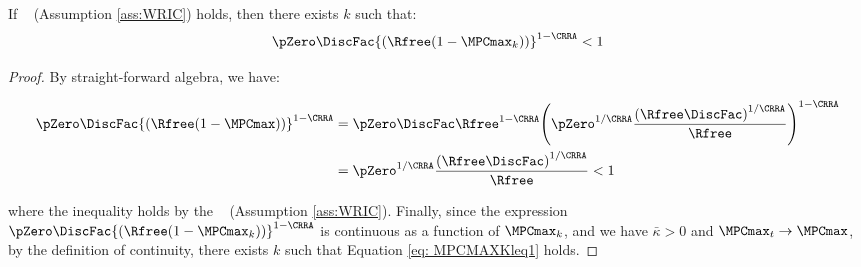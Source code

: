 \documentclass[\econtexRoot/BufferStockTheory]{subfiles}
\begin{document}
\begin{claim}\label{claim: MPCMAXKleq1}
If \WRIC~ (Assumption \ref{ass:WRIC}) holds, then there exists $k$ such that:
%
%
\begin{equation}\label{eq: MPCMAXKleq1}
  \pZero \DiscFac {(\Rfree (1-\MPCmax_{k}))}^{1-\CRRA}   < 1
\end{equation}
%
\end{claim}
\begin{proof}

By straight-forward algebra, we have:

\begin{align}
\pZero \DiscFac {(\Rfree (1-\MPCmax))}^{1-\CRRA}  & = \pZero\DiscFac\Rfree^{1-\CRRA}{\left(\pZero^{1/\CRRA}\frac{{(\Rfree\DiscFac)}^{1/\CRRA}}{\Rfree}\right)}^{1-\CRRA} \\\notag
& = \pZero^{1/\CRRA}\frac{{(\Rfree\DiscFac)}^{1/\CRRA}}{\Rfree} <1 \notag
\end{align}

where the inequality holds by the \WRIC ~ (Assumption \ref{ass:WRIC}). Finally, since the expression $\pZero \DiscFac {(\Rfree (1-\MPCmax_{k}))}^{1-\CRRA} $ is continuous as a function of $\MPCmax_{k}$, and we have $\bar{\kappa}>0$ and $\MPCmax_{t} \rightarrow \MPCmax$, by the definition of continuity, there exists $k$ such that Equation \eqref{eq: MPCMAXKleq1} holds. 
\end{proof}
\end{document}
